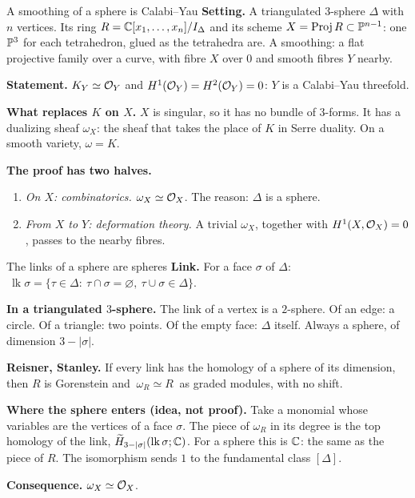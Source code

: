 \begin{frame}{A smoothing of a sphere is Calabi--Yau}
\textbf{Setting.} A triangulated \(3\)-sphere \(\Delta\) with \(n\) vertices. Its ring \(R=\mathbb C[x_1,\dots,x_n]/I_\Delta\) and its scheme \(X=\operatorname{Proj} R\subset\mathbb P^{n-1}\): one \(\mathbb P^3\) for each tetrahedron, glued as the tetrahedra are. A smoothing: a flat projective family over a curve, with fibre \(X\) over \(0\) and smooth fibres \(Y\) nearby.
\par\medskip
\textbf{Statement.} \(K_Y\simeq\mathcal O_Y\) and \(H^1(\mathcal O_Y)=H^2(\mathcal O_Y)=0\): \(Y\) is a Calabi--Yau threefold.
\par\medskip
\textbf{What replaces \(K\) on \(X\).} \(X\) is singular, so it has no bundle of \(3\)-forms. It has a dualizing sheaf \(\omega_X\): the sheaf that takes the place of \(K\) in Serre duality. On a smooth variety, \(\omega=K\).
\par\medskip
\textbf{The proof has two halves.}
\begin{enumerate}
\setlength{\itemsep}{2pt}
\item \emph{On \(X\): combinatorics.} \(\omega_X\simeq\mathcal O_X\). The reason: \(\Delta\) is a sphere.
\item \emph{From \(X\) to \(Y\): deformation theory.} A trivial \(\omega_X\), together with \(H^1(X,\mathcal O_X)=0\), passes to the nearby fibres.
\end{enumerate}
\end{frame}

\begin{frame}{The links of a sphere are spheres}
\textbf{Link.} For a face \(\sigma\) of \(\Delta\): \(\ \operatorname{lk}\sigma=\{\tau\in\Delta:\ \tau\cap\sigma=\varnothing,\ \tau\cup\sigma\in\Delta\}\).
\par\smallskip
\textbf{In a triangulated \(3\)-sphere.} The link of a vertex is a \(2\)-sphere. Of an edge: a circle. Of a triangle: two points. Of the empty face: \(\Delta\) itself. Always a sphere, of dimension \(3-|\sigma|\).
\par\smallskip
\textbf{Reisner, Stanley.} If every link has the homology of a sphere of its dimension, then \(R\) is Gorenstein and \(\ \boxed{\omega_R\simeq R}\ \) as graded modules, with no shift.
\par\smallskip
\textbf{Where the sphere enters (idea, not proof).} Take a monomial whose variables are the vertices of a face \(\sigma\). The piece of \(\omega_R\) in its degree is the top homology of the link, \(\widetilde H_{3-|\sigma|}(\operatorname{lk}\sigma;\mathbb C)\). For a sphere this is \(\mathbb C\): the same as the piece of \(R\). The isomorphism sends \(1\) to the fundamental class \([\Delta]\).
\par\smallskip
\textbf{Consequence.} \(\omega_X\simeq\mathcal O_X\).
\end{frame}

